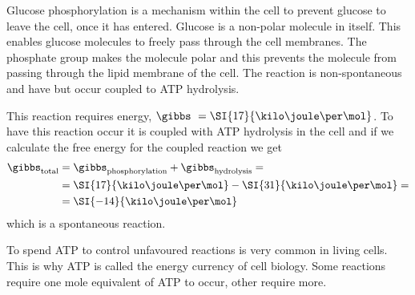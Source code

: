 \documentclass[../mit-general-chemistry.tex]{subfiles}
\begin{document}
\begin{hfigure}
  \vspace{1em}
  \begin{center}
  \end{center}
  \caption{
    Glucose phosphorylation is a mechanism within the cell to
    prevent glucose to leave the cell, once it has entered.  Glucose
    is a non-polar molecule in itself. This enables glucose
    molecules to freely pass through the cell membranes. The
    phosphate group makes the molecule polar and this prevents the
    molecule from passing through the lipid membrane of the
    cell. The reaction is non-spontaneous and have but occur coupled
    to ATP hydrolysis.
  }
\end{hfigure}




This reaction requires energy, $\gibbs\ =
\SI{17}{\kilo\joule\per\mol}$. To have this reaction occur it is
coupled with ATP hydrolysis in the cell and if we calculate the free
energy for the coupled reaction we get
\begin{align*}
  \gibbs_{\text{total}} &=
  \gibbs_{\text{phosphorylation}} + \gibbs_{\text{hydrolysis}} =\\ 
  &= \SI{17}{\kilo\joule\per\mol} - \SI{31}{\kilo\joule\per\mol} =\\
  &= \SI{-14}{\kilo\joule\per\mol} \\
\end{align*}
which is a spontaneous reaction.

To spend ATP to control unfavoured reactions is very common in living
cells. This is why ATP is called the energy currency of cell
biology. Some reactions require one mole equivalent of ATP to occur,
other require more.
\end{document}
